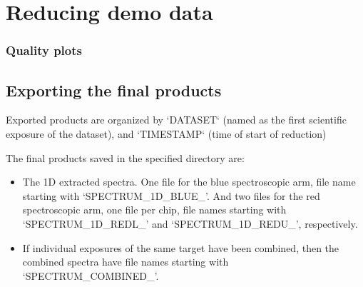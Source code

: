 
\section{Reducing demo data}
\label{sec:reducing_demo_data}



 
\subsubsection{Quality plots}


\subsection{Exporting the final products}
\label{sec:export_final_products}



 
 
Exported products are organized by `DATASET` (named as the first
scientific exposure of the dataset), and `TIMESTAMP` (time of start of
reduction)

The final products saved in the specified directory are: 

\begin{itemize}
\item The 1D extracted spectra. One file for the blue spectroscopic arm, file name starting with `SPECTRUM\_1D\_BLUE\_'. And two files for the red spectroscopic arm, one file per chip, file names starting with `SPECTRUM\_1D\_REDL\_' and `SPECTRUM\_1D\_REDU\_', respectively.
\item If individual exposures of the same target have been combined, then the combined spectra have file names starting with `SPECTRUM\_COMBINED\_'.
\end{itemize}
